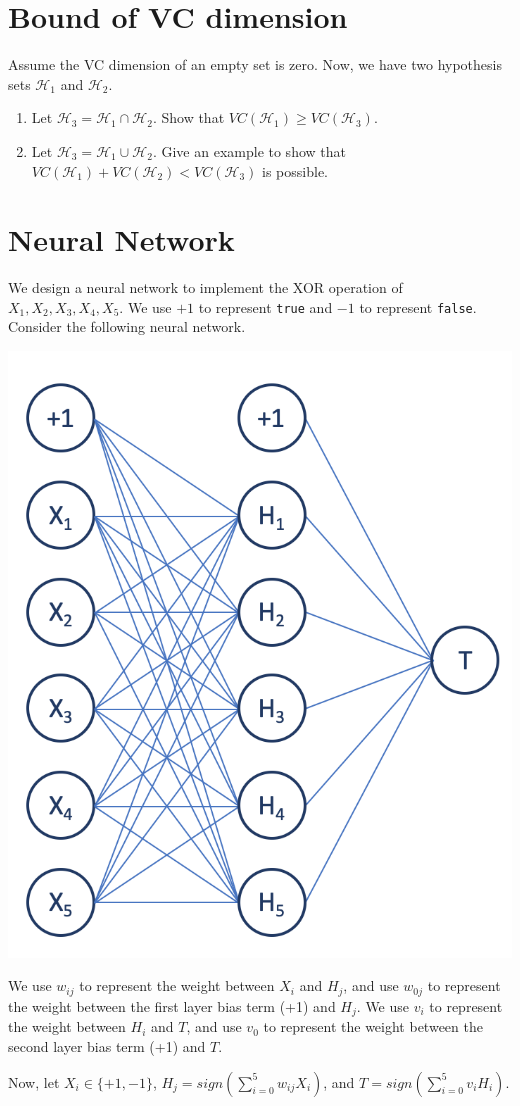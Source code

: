 \documentclass[11pt]{article}
\begin{document}
\section{Bound of VC dimension }

Assume the VC dimension of an empty set is zero. Now, we have two hypothesis sets $\mathcal{H}_1$ and $\mathcal{H}_2$.


\begin{enumerate}
    \item { Let  $\mathcal{H}_3 = \mathcal{H}_1 \cap \mathcal{H}_2$. Show that $VC(\mathcal{H}_1) \geq VC(\mathcal{H}_3)$. 
    
    \solution{}
    }
    \item { Let  $\mathcal{H}_3 = \mathcal{H}_1 \cup \mathcal{H}_2$. Give an example to show that $VC(\mathcal{H}_1) + VC(\mathcal{H}_2) < VC(\mathcal{H}_3)$ is possible. 
    
    \solution{}
    }
\end{enumerate}

\section{Neural Network }
We design a neural network to implement the XOR operation of $X_1, X_2, X_3, X_4, X_5$. We use $+1$ to represent \texttt{true} and $-1$ to represent \texttt{false}. Consider the following neural network. 

\includegraphics[width=.3\textwidth]{nnp2.png}

We use $w_{ij}$ to represent the weight between $X_i$ and $H_j$,  and use $w_{0j}$ to represent the weight between the first layer bias term (+1) and $H_j$. We use $v_i$ to represent the weight between $H_i$ and $T$, and use $v_0$ to represent the weight between the second layer bias term (+1) and $T$.

Now, let $X_i \in \{ +1, -1\}$, $H_j = sign\left(\sum^{5}_{i=0} w_{ij}X_i\right)$, and $T = sign\left(\sum^{5}_{i=0} v_{i}H_i\right)$. 
\end{document}

